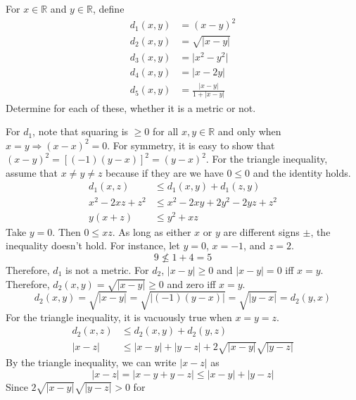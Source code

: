 \begin{exercise}
\item
  For \(x\in\mathbb{R}\) and \(y\in\mathbb{R}\), define
  \begin{align*}
    d_1(x, y) & = (x - y)^2\\
    d_2(x, y) & = \sqrt{\lvert x - y\rvert}\\
    d_3(x, y) & = \lvert x^2 - y^2\rvert\\
    d_4(x, y) & = \lvert x - 2y\rvert\\
    d_5(x, y) & = \frac{\lvert x - y\rvert}{1 + \lvert x - y\rvert}
  \end{align*}
  Determine for each of these, whether it is a metric or not.
  \par\smallskip
  For \(d_1\), note that squaring is \(\geq 0\) for all \(x,y\in\mathbb{R}\)
  and only when \(x = y\Rightarrow (x - x)^2 = 0\).
  For symmetry, it is easy to show that
  \((x - y)^2 = [(-1)(y - x)]^2 = (y - x)^2\).
  For the triangle inequality, assume that \(x\neq y\neq z\) because if they
  are we have \(0\leq 0\) and the identity holds.
  \begin{align*}
    d_1(x, z) & \leq d_1(x, y) + d_1(z, y)\\
    x^2 - 2xz + z^2 & \leq x^2 - 2xy + 2y^2 -2yz + z^2\\
    y(x + z) & \leq y^2 + xz
  \end{align*}
  Take \(y = 0\).
  Then \(0\leq xz\).
  As long as either \(x\) or \(y\) are different signs \(\pm\), the inequality
  doesn't hold.
  For instance, let \(y = 0\), \(x = -1\), and \(z = 2\).
  \[
  9\not\leq 1 + 4 = 5
  \]
  Therefore, \(d_1\) is not a metric.
  For \(d_2\), \(\lvert x - y\rvert\geq 0\) and \(\lvert x - y\rvert = 0\) iff
  \(x = y\).
  Therefore, \(d_2(x,y) = \sqrt{\lvert x - y\rvert}\geq 0\) and zero iff
  \(x = y\).
  \[
  d_2(x, y) = \sqrt{\lvert x - y\rvert} = \sqrt{\lvert (-1)(y - x)\rvert} =
  \sqrt{\lvert y - x\rvert} = d_2(y, x)
  \]
  For the triangle inequality, it is vacuously true when \(x = y = z\).
  \begin{align*}
    d_2(x, z) & \leq d_2(x, y) + d_2(y, z)\\
    \lvert x - z\rvert & \leq \lvert x - y\rvert + \lvert y - z\rvert +
                         2\sqrt{\lvert x - y\rvert}\sqrt{\lvert y - z\rvert}
  \end{align*}
  By the triangle inequality, we can write \(\lvert x - z\rvert\) as
  \[
  \lvert x - z\rvert = \lvert x - y + y - z\rvert\leq\lvert x - y\rvert +
  \lvert y - z\rvert
  \]
  Since \(2\sqrt{\lvert x - y\rvert}\sqrt{\lvert y - z\rvert} > 0\) for

\end{exercise}
